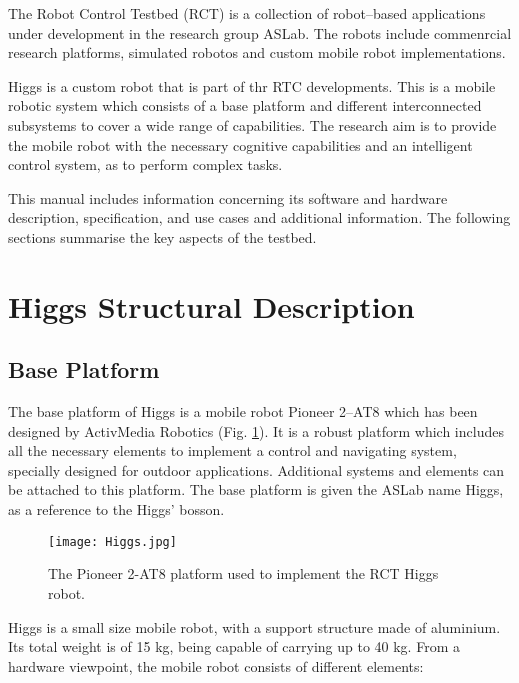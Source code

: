 The Robot Control Testbed (RCT) is a collection of robot--based applications
under development in the research group ASLab. The robots include commenrcial
research platforms, simulated robotos and custom mobile robot
implementations. 

Higgs is a custom robot that is part of thr RTC developments. This is a mobile
robotic system which consists of a base platform and different interconnected
subsystems to cover a wide range of capabilities. The research aim is to
provide the mobile robot with the necessary cognitive capabilities and an
intelligent control system, as to perform complex tasks. 

This manual includes information concerning its software and
hardware description, specification, and use cases and additional information.
 The following sections summarise the key aspects of the testbed.

\section{Higgs Structural Description}

\subsection{Base Platform}
The base platform of Higgs is a mobile robot Pioneer 2--AT8 which has been
designed by ActivMedia Robotics (Fig. \ref{Higgs}). It is a robust platform which includes all the necessary elements to implement a control and navigating system, specially designed for outdoor applications.  Additional systems and elements can be attached to this platform. The base platform is given the ASLab name Higgs, as a reference to the Higgs' bosson.\\
 
\begin{figure}[htdp]
\begin{center}
 {\texttt{[image: Higgs.jpg]}}
\end{center}
\caption{The Pioneer 2-AT8 platform used to implement the RCT Higgs robot.}
\label{Higgs}
\end{figure}


Higgs is a small size mobile robot, with a support structure made of aluminium. Its total weight is of 15 kg, being capable of carrying up to 40 kg. From a hardware viewpoint, the mobile robot consists of different elements: 

